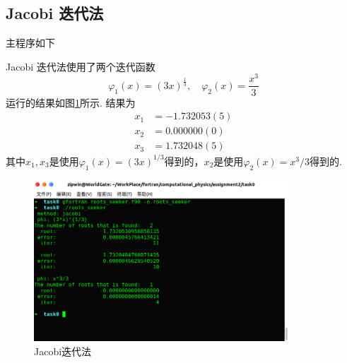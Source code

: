 \documentclass{article}
\begin{document}
	\subsection{Jacobi 迭代法}
	主程序如下
	
	Jacobi 迭代法使用了两个迭代函数
	\[
	\varphi_1(x)=(3x)^\frac{1}{3},\quad\varphi_2(x)=\frac{x^3}{3}
	\]
	运行的结果如图\ref{fig:rtr_jacobi}所示. 结果为
	\[
	\begin{split}
	x_1&=-1.732053(5) \\
	x_2&=0.000000(0) \\
	x_3&=1.732048(5)
	\end{split}
	\]
	其中$x_1,x_3$是使用$\varphi_1(x)=(3x)^{1/3}$得到的，$x_2$是使用$\varphi_2(x)=x^3/3$得到的.
	\begin{figure}[htb]
		\centering
		\includegraphics[width=0.85\textwidth]{./utils/rtr_jacobi.png}
		\caption{ Jacobi迭代法\label{fig:rtr_jacobi}}
	\end{figure}
\end{document}
